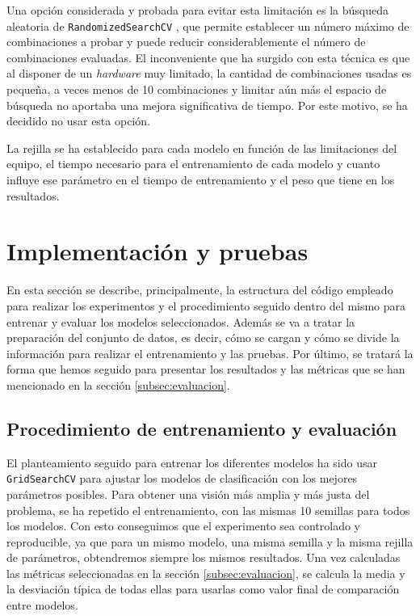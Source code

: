 \vspace{1em}

Una opción considerada y probada para evitar esta limitación es la búsqueda aleatoria de \texttt{RandomizedSearchCV} \cite{randomized}, que permite establecer un número máximo de combinaciones a probar y puede reducir considerablemente el número de combinaciones evaluadas. El inconveniente que ha surgido con esta técnica es que al disponer de un \textit{hardware} muy limitado, la cantidad de combinaciones usadas es pequeña, a veces menos de 10 combinaciones y limitar aún más el espacio de búsqueda no aportaba una mejora significativa de tiempo. Por este motivo, se ha decidido no usar esta opción.

\vspace{1em}

La rejilla se ha establecido para cada modelo en función de las limitaciones del equipo, el tiempo necesario para el entrenamiento de cada modelo y cuanto influye ese parámetro en el tiempo de entrenamiento y el peso que tiene en los resultados.

\section{Implementación y pruebas}
\label{sec:implementacion}

En esta sección se describe, principalmente, la estructura del código empleado para realizar los experimentos y el procedimiento seguido dentro del mismo para entrenar y evaluar los modelos seleccionados. Además se va a tratar la preparación del conjunto de datos, es decir, cómo se cargan y cómo se divide la información para realizar el entrenamiento y las pruebas. Por último, se tratará la forma que hemos seguido para presentar los resultados y las métricas que se han mencionado en la sección \ref{subsec:evaluacion}.

\subsection{Procedimiento de entrenamiento y evaluación}
\label{subsec:procedimiento}

El planteamiento seguido para entrenar los diferentes modelos ha sido usar \texttt{GridSearchCV} para ajustar los modelos de clasificación con los mejores parámetros posibles. Para obtener una visión más amplia y más justa del problema, se ha repetido el entrenamiento, con las mismas 10 semillas para todos los modelos. Con esto conseguimos que el experimento sea controlado y reproducible, ya que para un mismo modelo, una misma semilla y la misma rejilla de parámetros, obtendremos siempre los mismos resultados. Una vez calculadas las métricas seleccionadas en la sección \ref{subsec:evaluacion}, se calcula la media y la desviación típica de todas ellas para usarlas como valor final de comparación entre modelos.

